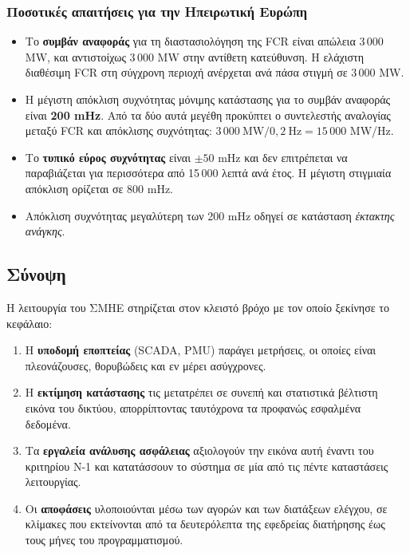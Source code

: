 \subsubsection*{Ποσοτικές απαιτήσεις για την Ηπειρωτική Ευρώπη}

\begin{itemize}
\item Το \textbf{συμβάν αναφοράς} για τη διαστασιολόγηση της FCR είναι απώλεια 3\,000 MW,
      και αντιστοίχως 3\,000 MW στην αντίθετη κατεύθυνση. Η ελάχιστη διαθέσιμη FCR στη
      σύγχρονη περιοχή ανέρχεται ανά πάσα στιγμή σε 3\,000 MW.
\item Η μέγιστη απόκλιση συχνότητας μόνιμης κατάστασης για το συμβάν αναφοράς είναι
      \textbf{200 mHz}. Από τα δύο αυτά μεγέθη προκύπτει ο συντελεστής αναλογίας μεταξύ FCR
      και απόκλισης συχνότητας: $3\,000\ \text{MW} / 0{,}2\ \text{Hz} = 15\,000$ MW/Hz.
\item Το \textbf{τυπικό εύρος συχνότητας} είναι $\pm 50$ mHz και δεν επιτρέπεται να
      παραβιάζεται για περισσότερα από 15\,000 λεπτά ανά έτος. Η μέγιστη στιγμιαία απόκλιση
      ορίζεται σε 800 mHz.
\item Απόκλιση συχνότητας μεγαλύτερη των 200 mHz οδηγεί σε κατάσταση \emph{έκτακτης
      ανάγκης}.
\end{itemize}

\subsection{Σύνοψη}

Η λειτουργία του ΣΜΗΕ στηρίζεται στον κλειστό βρόχο με τον οποίο ξεκίνησε το κεφάλαιο:

\begin{enumerate}
\item Η \textbf{υποδομή εποπτείας} (SCADA, PMU) παράγει μετρήσεις, οι οποίες είναι
      πλεονάζουσες, θορυβώδεις και εν μέρει ασύγχρονες.
\item Η \textbf{εκτίμηση κατάστασης} τις μετατρέπει σε συνεπή και στατιστικά βέλτιστη
      εικόνα του δικτύου, απορρίπτοντας ταυτόχρονα τα προφανώς εσφαλμένα δεδομένα.
\item Τα \textbf{εργαλεία ανάλυσης ασφάλειας} αξιολογούν την εικόνα αυτή έναντι του
      κριτηρίου N-1 και κατατάσσουν το σύστημα σε μία από τις πέντε καταστάσεις λειτουργίας.
\item Οι \textbf{αποφάσεις} υλοποιούνται μέσω των αγορών και των διατάξεων ελέγχου, σε
      κλίμακες που εκτείνονται από τα δευτερόλεπτα της εφεδρείας διατήρησης έως τους μήνες
      του προγραμματισμού.
\end{enumerate}

